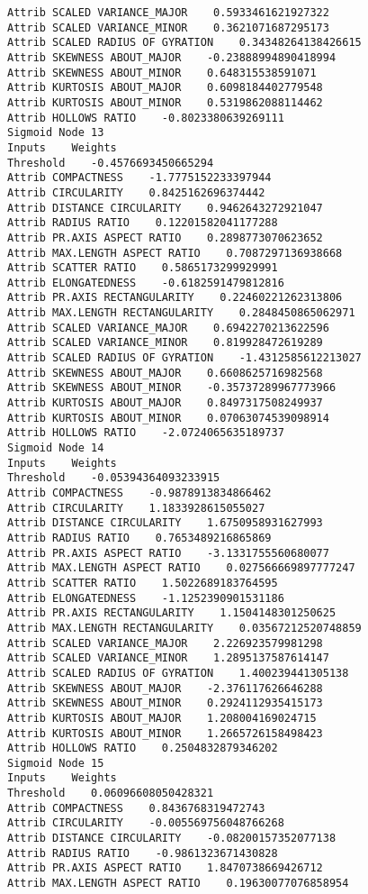 \documentclass[
	article,			%
	11pt,				%
	oneside,			%
	a4paper,			%
	english,			%
	brazil,				%
	sumario=tradicional
	]{abntex2}
\begin{document}
\begin{lstlisting}
Attrib SCALED VARIANCE_MAJOR    0.5933461621927322
Attrib SCALED VARIANCE_MINOR    0.3621071687295173
Attrib SCALED RADIUS OF GYRATION    0.34348264138426615
Attrib SKEWNESS ABOUT_MAJOR    -0.23888994890418994
Attrib SKEWNESS ABOUT_MINOR    0.648315538591071
Attrib KURTOSIS ABOUT_MAJOR    0.6098184402779548
Attrib KURTOSIS ABOUT_MINOR    0.5319862088114462
Attrib HOLLOWS RATIO    -0.8023380639269111
Sigmoid Node 13
Inputs    Weights
Threshold    -0.4576693450665294
Attrib COMPACTNESS    -1.7775152233397944
Attrib CIRCULARITY    0.8425162696374442
Attrib DISTANCE CIRCULARITY    0.9462643272921047
Attrib RADIUS RATIO    0.12201582041177288
Attrib PR.AXIS ASPECT RATIO    0.2898773070623652
Attrib MAX.LENGTH ASPECT RATIO    0.7087297136938668
Attrib SCATTER RATIO    0.5865173299929991
Attrib ELONGATEDNESS    -0.6182591479812816
Attrib PR.AXIS RECTANGULARITY    0.22460221262313806
Attrib MAX.LENGTH RECTANGULARITY    0.2848450865062971
Attrib SCALED VARIANCE_MAJOR    0.6942270213622596
Attrib SCALED VARIANCE_MINOR    0.819928472619289
Attrib SCALED RADIUS OF GYRATION    -1.4312585612213027
Attrib SKEWNESS ABOUT_MAJOR    0.6608625716982568
Attrib SKEWNESS ABOUT_MINOR    -0.35737289967773966
Attrib KURTOSIS ABOUT_MAJOR    0.8497317508249937
Attrib KURTOSIS ABOUT_MINOR    0.07063074539098914
Attrib HOLLOWS RATIO    -2.0724065635189737
Sigmoid Node 14
Inputs    Weights
Threshold    -0.05394364093233915
Attrib COMPACTNESS    -0.9878913834866462
Attrib CIRCULARITY    1.1833928615055027
Attrib DISTANCE CIRCULARITY    1.6750958931627993
Attrib RADIUS RATIO    0.7653489216865869
Attrib PR.AXIS ASPECT RATIO    -3.1331755560680077
Attrib MAX.LENGTH ASPECT RATIO    0.027566669897777247
Attrib SCATTER RATIO    1.5022689183764595
Attrib ELONGATEDNESS    -1.1252390901531186
Attrib PR.AXIS RECTANGULARITY    1.1504148301250625
Attrib MAX.LENGTH RECTANGULARITY    0.03567212520748859
Attrib SCALED VARIANCE_MAJOR    2.226923579981298
Attrib SCALED VARIANCE_MINOR    1.2895137587614147
Attrib SCALED RADIUS OF GYRATION    1.400239441305138
Attrib SKEWNESS ABOUT_MAJOR    -2.376117626646288
Attrib SKEWNESS ABOUT_MINOR    0.2924112935415173
Attrib KURTOSIS ABOUT_MAJOR    1.208004169024715
Attrib KURTOSIS ABOUT_MINOR    1.2665726158498423
Attrib HOLLOWS RATIO    0.2504832879346202
Sigmoid Node 15
Inputs    Weights
Threshold    0.06096608050428321
Attrib COMPACTNESS    0.8436768319472743
Attrib CIRCULARITY    -0.005569756048766268
Attrib DISTANCE CIRCULARITY    -0.08200157352077138
Attrib RADIUS RATIO    -0.9861323671430828
Attrib PR.AXIS ASPECT RATIO    1.8470738669426712
Attrib MAX.LENGTH ASPECT RATIO    0.19630077076858954

\end{lstlisting}
\end{document}
